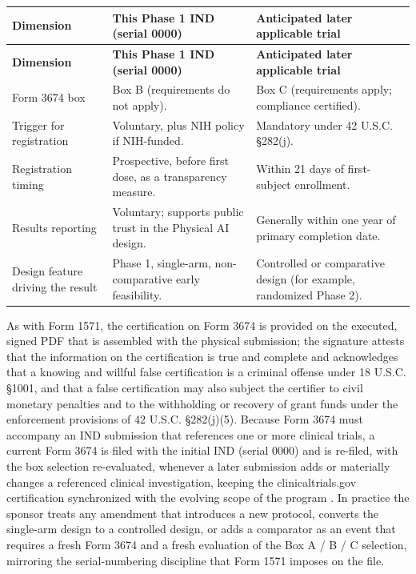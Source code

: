 \begin{center}
\begin{xltabular}{\textwidth}{>{\raggedright\arraybackslash}p{3.6cm} Y Y}
\toprule
\textbf{Dimension} & \textbf{This Phase 1 IND (serial 0000)} & \textbf{Anticipated later applicable trial} \\
\midrule
\endfirsthead
\toprule
\textbf{Dimension} & \textbf{This Phase 1 IND (serial 0000)} & \textbf{Anticipated later applicable trial} \\
\midrule
\endhead
\bottomrule
\endfoot
Form 3674 box & Box B (requirements do not apply). & Box C (requirements apply; compliance certified). \\
Trigger for registration & Voluntary, plus NIH policy if NIH-funded. & Mandatory under 42 U.S.C. \S 282(j). \\
Registration timing & Prospective, before first dose, as a transparency measure. & Within 21 days of first-subject enrollment. \\
Results reporting & Voluntary; supports public trust in the Physical AI design. & Generally within one year of primary completion date. \\
Design feature driving the result & Phase 1, single-arm, non-comparative early feasibility. & Controlled or comparative design (for example, randomized Phase 2). \\
\bottomrule
\end{xltabular}
\end{center}
\vspace{-1.75cm}

As with Form 1571, the certification on Form 3674 is provided on the
executed, signed PDF that is assembled with the physical submission; the
signature attests that the information on the certification is true and
complete and acknowledges that a knowing and willful false certification
is a criminal offense under 18 U.S.C. \S 1001, and that a false
certification may also subject the certifier to civil monetary penalties
and to the withholding or recovery of grant funds under the enforcement
provisions of 42 U.S.C. \S 282(j)(5). Because Form 3674 must
accompany an IND submission that references one or more clinical trials,
a current Form 3674 is filed with the initial IND (serial 0000) and is
re-filed, with the box selection re-evaluated, whenever a later
submission adds or materially changes a referenced clinical
investigation, keeping the clinicaltrials.gov certification synchronized
with the evolving scope of the program \cite{phase1guidance,
paisitedocpk}. In practice the sponsor treats any amendment that
introduces a new protocol, converts the single-arm design to a controlled
design, or adds a comparator as an event that requires a fresh Form 3674
and a fresh evaluation of the Box A / B / C selection, mirroring the
serial-numbering discipline that Form 1571 imposes on the file.

